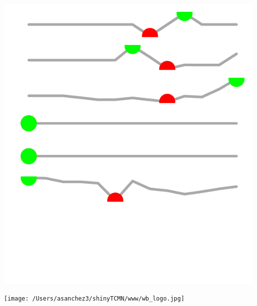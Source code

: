 \documentclass{article}\usepackage[]{graphicx}\usepackage[]{color}
\makeatletter
\def\maxwidth{ %
  \ifdim\Gin@nat@width>\linewidth
    \linewidth
  \else
    \Gin@nat@width
  \fi
}
\makeatother
\begin{document}
\begin{minipage}[c]{0.11\textwidth}
  \vspace*{+1.6cm}


{\centering \includegraphics[width=\maxwidth]{figure/sparklines_Supports-1} 

}



  \vspace*{-0.5cm}
\end{minipage}

\vspace{2ex}
\begin{minipage}[c]{0.33\textwidth}
  \hspace*{+0.3cm} \texttt{[image: /Users/asanchez3/shinyTCMN/www/wb\_logo.jpg]}
\end{minipage}
\begin{minipage}[c]{0.65\textwidth}
  \vspace*{-0.4cm}
\end{minipage}

\end{document}
